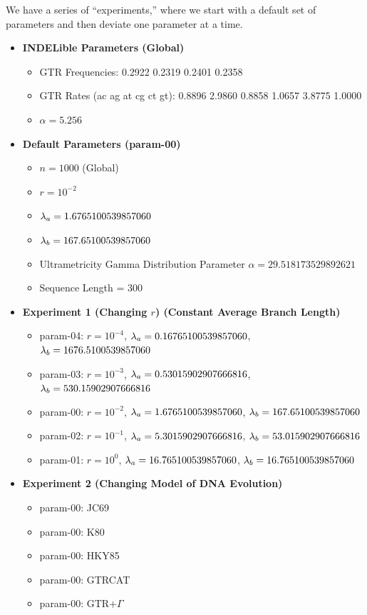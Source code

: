 We have a series of ``experiments,'' where we start with a default set of parameters and then deviate one parameter at a time.

\begin{itemize}
\item \textbf{INDELible Parameters (Global)}
\begin{itemize}
\item \gls{GTR} Frequencies: 0.2922 0.2319 0.2401 0.2358
\item \gls{GTR} Rates (ac ag at cg ct gt): 0.8896 2.9860 0.8858 1.0657 3.8775 1.0000
\item $\alpha = 5.256$
\end{itemize}

\item \textbf{Default Parameters (param-00)}
\begin{itemize}
\item $n = 1000$ (Global)
\item $r = 10^{-2}$
\item $\lambda_a = 1.6765100539857060$
\item $\lambda_b = 167.65100539857060$
\item Ultrametricity Gamma Distribution Parameter $\alpha = 29.518173529892621$
\item Sequence Length = 300
\end{itemize}

\item \textbf{Experiment 1 (Changing $r$) (Constant Average Branch Length)}
\begin{itemize}
\item param-04: $r = 10^{-4}$, $\lambda_a = 0.16765100539857060$, $\lambda_b = 1676.5100539857060$
\item param-03: $r = 10^{-3}$, $\lambda_a = 0.53015902907666816$, $\lambda_b = 530.15902907666816$
\item param-00: $r = 10^{-2}$, $\lambda_a = 1.6765100539857060$, $\lambda_b = 167.65100539857060$
\item param-02: $r = 10^{-1}$, $\lambda_a = 5.3015902907666816$, $\lambda_b = 53.015902907666816$
\item param-01: $r = 10^{0}$, $\lambda_a = 16.765100539857060$, $\lambda_b = 16.765100539857060$
\end{itemize}

\item \textbf{Experiment 2 (Changing Model of DNA Evolution)}
\begin{itemize}
\item param-00: JC69
\item param-00: K80
\item param-00: HKY85
\item param-00: GTRCAT
\item param-00: \gls{GTR}+$\Gamma$
\end{itemize}


\end{itemize}
